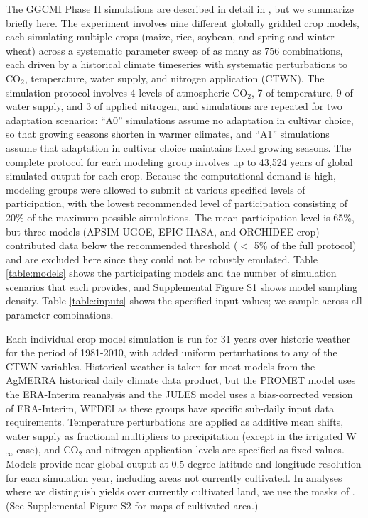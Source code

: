 \documentclass[gmdd]{copernicus} %
\begin{document}
The GGCMI Phase II simulations are described in detail in \citet{franke2019ctwnexperiment}, but we summarize briefly here. 
The experiment involves nine different globally gridded crop models, each simulating multiple crops (maize, rice, soybean, and spring and winter wheat) across a systematic parameter sweep of as many as 756 combinations, each driven by a historical climate timeseries with systematic perturbations to CO$_2$, temperature, water supply, and nitrogen application (CTWN). 
The simulation protocol involves 4 levels of atmospheric CO$_2$, 7 of temperature, 9 of water supply, and 3 of applied nitrogen, and simulations are repeated for two adaptation scenarios: ``A0'' simulations assume no adaptation in cultivar choice, so that growing seasons shorten in warmer climates, and ``A1'' simulations assume that adaptation in cultivar choice maintains fixed growing seasons.
The complete protocol for each modeling group involves up to 43,524 years of global simulated output for each crop. 
Because the computational demand is high, modeling groups were allowed to submit at various specified levels of participation, with the lowest recommended level of participation consisting of 20\% of the maximum possible simulations. The mean participation level is 65\%, but three models (APSIM-UGOE, EPIC-IIASA, and ORCHIDEE-crop) contributed data below the recommended threshold ($<$ 5\% of the full protocol) and are excluded here since they could not be robustly emulated. 
Table \ref{table:models} shows the participating models and the number of simulation scenarios that each provides, and Supplemental Figure S1 shows model sampling density. Table \ref{table:inputs} shows the specified input values; we sample across all parameter combinations. 

Each individual crop model simulation is run for 31 years over historic weather for the period of 1981-2010, with added uniform perturbations to any of the CTWN variables.
Historical weather is taken for most models from the AgMERRA \citep{Ruane2015} historical daily climate data product, but the PROMET model uses the ERA-Interim reanalysis \citep{dee2011era} and the JULES model uses a bias-corrected version of ERA-Interim, WFDEI \citep[WATCH-Forcing-Data-ERA-Interim,][]{weedon2014wfdei} as these groups have specific sub-daily input data requirements. 
Temperature perturbations are applied as additive mean shifts, water supply as fractional multipliers to precipitation (except in the irrigated W$_{\infty}$ case), and CO$_2$ and nitrogen application levels are specified as fixed values. 
Models provide near-global output at 0.5 degree latitude and longitude resolution for each simulation year, including areas not currently cultivated. 
In analyses where we distinguish yields over currently cultivated land, we use the masks of \citet{Portmann2010}. 
(See Supplemental Figure S2 for maps of cultivated area.)
\end{document}
